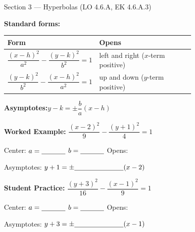 \documentclass[10pt]{article}
\begin{document}
\begin{notesbox}{Section 3 --- Hyperbolas (LO 4.6.A, EK 4.6.A.3)}

\textbf{Standard forms:}

\vspace{4pt}
\renewcommand{\arraystretch}{1.8}
\begin{tabularx}{\linewidth}{@{} p{0.44\linewidth} X @{}}
\textbf{Form} & \textbf{Opens} \\
\midrule
$\dfrac{(x-h)^2}{a^2} - \dfrac{(y-k)^2}{b^2} = 1$ &
  left and right ($x$-term positive) \\[4pt]
$\dfrac{(y-k)^2}{b^2} - \dfrac{(x-h)^2}{a^2} = 1$ &
  up and down ($y$-term positive) \\
\end{tabularx}

\vspace{8pt}
\textbf{Asymptotes:}\quad $y - k = \pm\dfrac{b}{a}(x - h)$

\vspace{10pt}
\textbf{Worked Example:}\quad
$\dfrac{(x-2)^2}{9} - \dfrac{(y+1)^2}{4} = 1$

Center: \blank{3cm} \quad $a = \blank{1.2cm}$ \quad $b = \blank{1.2cm}$ \quad
Opens: \blank{2cm}

Asymptotes: $y + 1 = \pm\blank{2.5cm}(x - 2)$

\vspace{10pt}
\textbf{Student Practice:}\quad
$\dfrac{(y+3)^2}{16} - \dfrac{(x-1)^2}{9} = 1$

Center: \blank{3cm} \quad $a = \blank{1.2cm}$ \quad $b = \blank{1.2cm}$ \quad
Opens: \blank{2cm}

Asymptotes: $y + 3 = \pm\blank{2.5cm}(x - 1)$

\end{notesbox}
\end{document}
